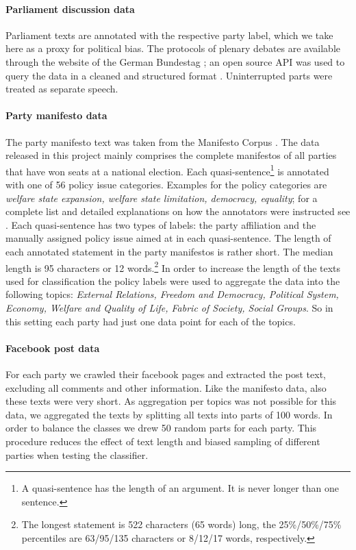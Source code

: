 \documentclass[11pt]{article}
\begin{document}
\paragraph{Parliament discussion data} Parliament texts are annotated with the respective party label, which we take here as a proxy for political bias. The protocols of plenary debates are available through the website of the German Bundestag \cite{bundestag}; an open source API was used to query the data in a cleaned and structured format \cite{bundestag-github}. Uninterrupted parts were treated as separate speech. 

\paragraph{Party manifesto data}
The party manifesto text was taken from the Manifesto Corpus  \cite{manifesto}. The data released in this project mainly comprises the complete manifestos of all parties that have won seats at a national election. Each quasi-sentence\footnote{A quasi-sentence has the length of an argument. It is never longer than one sentence.} is annotated with one of 56 policy issue categories. Examples for the policy categories are {\em welfare state expansion, welfare state limitation, democracy, equality}; for a complete list and detailed explanations on how the annotators were instructed see \cite{leftright}. Each quasi-sentence has  two types of labels: the party affiliation and the manually assigned policy issue aimed at in each quasi-sentence. The length of each annotated statement in the party manifestos is rather short. The median length is 95 characters or 12 words.\footnote{The longest statement is 522 characters (65 words) long, the 25\%/50\%/75\% percentiles are 63/95/135 characters or 8/12/17 words, respectively.} 
In order to increase the length of the texts used for classification the policy labels were used to aggregate the data into the following topics: {\em External Relations, Freedom and Democracy, Political System, Economy, Welfare and Quality of Life, Fabric of Society, Social Groups}. So in this setting each party had just one data point for each of the topics. 

\paragraph{Facebook post data}
For each party we crawled their facebook pages \cite{gruene-fb, spd-fb, cducsu-fb, linke-fb} and extracted the post text, excluding all comments and other information. Like the manifesto data, also these texts were very short. As aggregation per topics was not possible for this data, we aggregated the texts by splitting all texts into parts of 100 words. In order to balance the classes we drew 50 random parts for each party. This procedure reduces the effect of text length and biased sampling of different parties when testing the classifier. 
\end{document}
